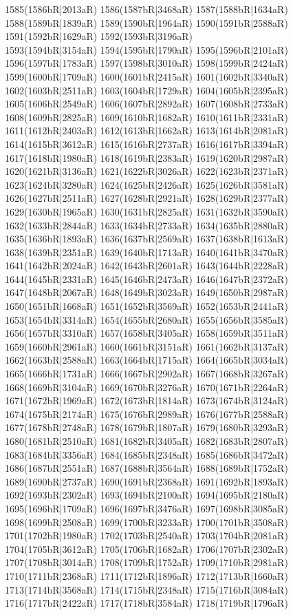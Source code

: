 1585(1586bR|2013aR) 1586(1587bR|3468aR) 1587(1588bR|1634aR) 1588(1589bR|1839aR) 1589(1590bR|1964aR) 1590(1591bR|2588aR) 1591(1592bR|1629aR) 1592(1593bR|3196aR) \\1593(1594bR|3154aR) 1594(1595bR|1790aR) 1595(1596bR|2101aR) 1596(1597bR|1783aR) 1597(1598bR|3010aR) 1598(1599bR|2424aR) 1599(1600bR|1709aR) 1600(1601bR|2415aR) 1601(1602bR|3340aR) \\1602(1603bR|2511aR) 1603(1604bR|1729aR) 1604(1605bR|2395aR) 1605(1606bR|2549aR) 1606(1607bR|2892aR) 1607(1608bR|2733aR) 1608(1609bR|2825aR) 1609(1610bR|1682aR) 1610(1611bR|2331aR) \\1611(1612bR|2403aR) 1612(1613bR|1662aR) 1613(1614bR|2081aR) 1614(1615bR|3612aR) 1615(1616bR|2737aR) 1616(1617bR|3394aR) 1617(1618bR|1980aR) 1618(1619bR|2383aR) 1619(1620bR|2987aR) \\1620(1621bR|3136aR) 1621(1622bR|3026aR) 1622(1623bR|2371aR) 1623(1624bR|3280aR) 1624(1625bR|2426aR) 1625(1626bR|3581aR) 1626(1627bR|2511aR) 1627(1628bR|2921aR) 1628(1629bR|2377aR) \\1629(1630bR|1965aR) 1630(1631bR|2825aR) 1631(1632bR|3590aR) 1632(1633bR|2844aR) 1633(1634bR|2733aR) 1634(1635bR|2880aR) 1635(1636bR|1893aR) 1636(1637bR|2569aR) 1637(1638bR|1613aR) \\1638(1639bR|2351aR) 1639(1640bR|1713aR) 1640(1641bR|3470aR) 1641(1642bR|2024aR) 1642(1643bR|2601aR) 1643(1644bR|2228aR) 1644(1645bR|2331aR) 1645(1646bR|2473aR) 1646(1647bR|2372aR) \\1647(1648bR|2067aR) 1648(1649bR|3023aR) 1649(1650bR|2987aR) 1650(1651bR|1668aR) 1651(1652bR|3569aR) 1652(1653bR|2441aR) 1653(1654bR|3314aR) 1654(1655bR|2680aR) 1655(1656bR|3585aR) \\1656(1657bR|3310aR) 1657(1658bR|3405aR) 1658(1659bR|3511aR) 1659(1660bR|2961aR) 1660(1661bR|3151aR) 1661(1662bR|3137aR) 1662(1663bR|2588aR) 1663(1664bR|1715aR) 1664(1665bR|3034aR) \\1665(1666bR|1731aR) 1666(1667bR|2902aR) 1667(1668bR|3267aR) 1668(1669bR|3104aR) 1669(1670bR|3276aR) 1670(1671bR|2264aR) 1671(1672bR|1969aR) 1672(1673bR|1814aR) 1673(1674bR|3124aR) \\1674(1675bR|2174aR) 1675(1676bR|2989aR) 1676(1677bR|2588aR) 1677(1678bR|2748aR) 1678(1679bR|1807aR) 1679(1680bR|3293aR) 1680(1681bR|2510aR) 1681(1682bR|3405aR) 1682(1683bR|2807aR) \\1683(1684bR|3356aR) 1684(1685bR|2348aR) 1685(1686bR|3472aR) 1686(1687bR|2551aR) 1687(1688bR|3564aR) 1688(1689bR|1752aR) 1689(1690bR|2737aR) 1690(1691bR|2368aR) 1691(1692bR|1893aR) \\1692(1693bR|2302aR) 1693(1694bR|2100aR) 1694(1695bR|2180aR) 1695(1696bR|1709aR) 1696(1697bR|3476aR) 1697(1698bR|3085aR) 1698(1699bR|2508aR) 1699(1700bR|3233aR) 1700(1701bR|3508aR) \\1701(1702bR|1980aR) 1702(1703bR|2540aR) 1703(1704bR|2081aR) 1704(1705bR|3612aR) 1705(1706bR|1682aR) 1706(1707bR|2302aR) 1707(1708bR|3014aR) 1708(1709bR|1752aR) 1709(1710bR|2981aR) \\1710(1711bR|2368aR) 1711(1712bR|1896aR) 1712(1713bR|1660aR) 1713(1714bR|3568aR) 1714(1715bR|2348aR) 1715(1716bR|3084aR) 1716(1717bR|2422aR) 1717(1718bR|3584aR) 1718(1719bR|1796aR) 